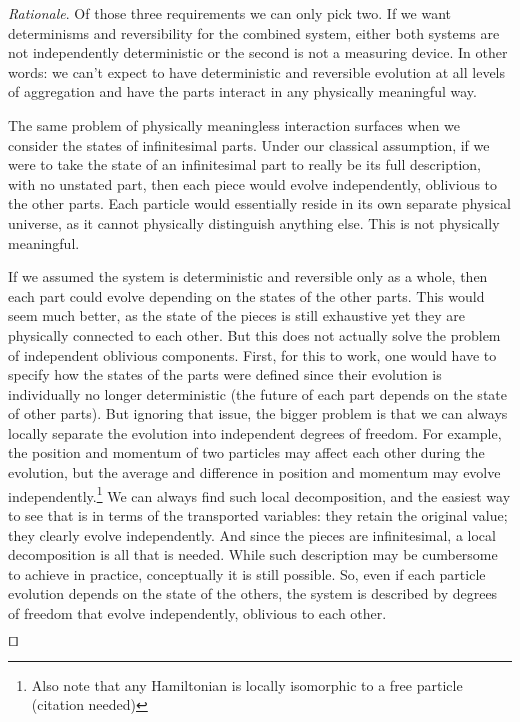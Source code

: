 \documentclass[smallextended]{svjour3}
\numberwithin{equation}{section}
\newenvironment{rationale}{\emph{Rationale}.}{\hfill\(\qed\)}
\theoremstyle{definition}
\newenvironment{rationale}{\emph{Rationale}.}{\qed}
\begin{document}
\begin{rationale}
	Of those three requirements we can only pick two. If we want determinisms and reversibility for the combined system, either both systems are not independently deterministic or the second is not a measuring device. In other words: we can't expect to have deterministic and reversible evolution at all levels of aggregation and have the parts interact in any physically meaningful way.
	
	The same problem of physically meaningless interaction surfaces when we consider the states of infinitesimal parts. Under our classical assumption, if we were to take the state of an infinitesimal part to really be its full description, with no unstated part, then each piece would evolve independently, oblivious to the other parts. Each particle would essentially reside in its own separate physical universe, as it cannot physically distinguish anything else. This is not physically meaningful.
	
	If we assumed the system is deterministic and reversible only as a whole, then each part could evolve depending on the states of the other parts. This would seem much better, as the state of the pieces is still exhaustive yet they are physically connected to each other. But this does not actually solve the problem of independent oblivious components. First, for this to work, one would have to specify how the states of the parts were defined since their evolution is individually no longer deterministic (the future of each part depends on the state of other parts). But ignoring that issue, the bigger problem is that we can always locally separate the evolution into independent degrees of freedom. For example, the position and momentum of two particles may affect each other during the evolution, but the average and difference in position and momentum may evolve independently.\footnote{Also note that any Hamiltonian is locally isomorphic to a free particle (citation needed)} We can always find such local decomposition, and the easiest way to see that is in terms of the transported variables: they retain the original value; they clearly evolve independently. And since the pieces are infinitesimal, a local decomposition is all that is needed. While such description may be cumbersome to achieve in practice, conceptually it is still possible. So, even if each particle evolution depends on the state of the others, the system is described by degrees of freedom that evolve independently, oblivious to each other.	
	

\end{rationale}
\end{document}

